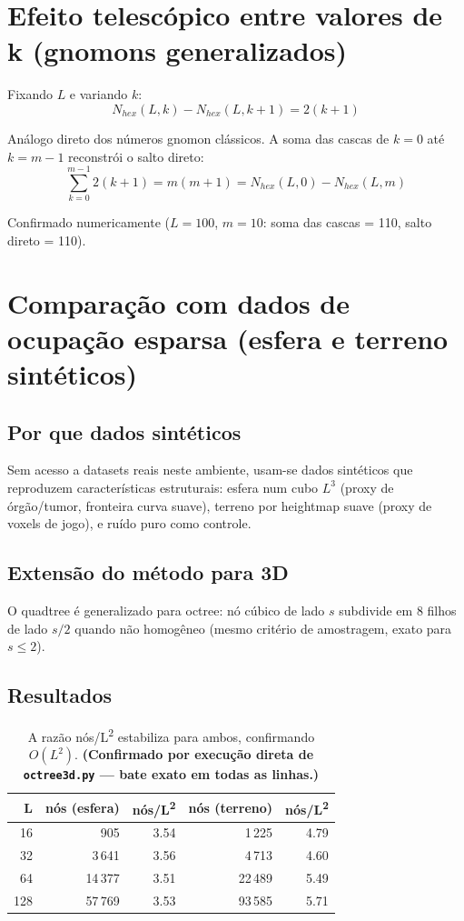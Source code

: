 \documentclass[11pt,a4paper]{article}
\begin{document}
\section{Efeito telescópico entre valores de k (gnomons generalizados)}

Fixando $L$ e variando $k$:
\[
N_{hex}(L,k) - N_{hex}(L,k+1) = 2(k+1)
\]

Análogo direto dos números gnomon clássicos. A soma das cascas de $k=0$ até $k=m-1$ reconstrói o salto direto:
\[
\sum_{k=0}^{m-1} 2(k+1) = m(m+1) = N_{hex}(L,0) - N_{hex}(L,m)
\]

Confirmado numericamente ($L=100$, $m=10$: soma das cascas = 110, salto direto = 110).

\section{Comparação com dados de ocupação esparsa (esfera e terreno sintéticos)}

\subsection{Por que dados sintéticos}

Sem acesso a datasets reais neste ambiente, usam-se dados sintéticos que reproduzem características estruturais: esfera num cubo $L^3$ (proxy de órgão/tumor, fronteira curva suave), terreno por heightmap suave (proxy de voxels de jogo), e ruído puro como controle.

\subsection{Extensão do método para 3D}

O quadtree é generalizado para octree: nó cúbico de lado $s$ subdivide em 8 filhos de lado $s/2$ quando não homogêneo (mesmo critério de amostragem, exato para $s \le 2$).

\subsection{Resultados}

\begin{table}[h]
\centering
\begin{tabular}{rrrrr}
\toprule
L & nós (esfera) & nós/L\textsuperscript{2} & nós (terreno) & nós/L\textsuperscript{2} \\
\midrule
16  & 905     & 3.54 & 1\,225  & 4.79 \\
32  & 3\,641  & 3.56 & 4\,713  & 4.60 \\
64  & 14\,377 & 3.51 & 22\,489 & 5.49 \\
128 & 57\,769 & 3.53 & 93\,585 & 5.71 \\
\bottomrule
\end{tabular}
\caption{A razão nós/L\textsuperscript{2} estabiliza para ambos, confirmando $O(L^2)$. \textbf{(Confirmado por execução direta de \texttt{octree3d.py} --- bate exato em todas as linhas.)}}
\end{table}
\end{document}
